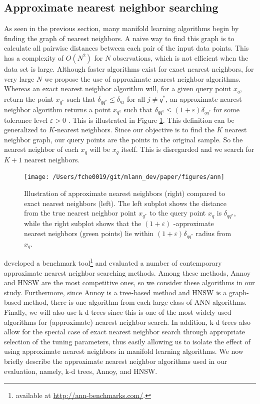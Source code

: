 \documentclass[11pt,a4paper,]{article}
\begin{document}
\hypertarget{ann}{%
\subsection{Approximate nearest neighbor searching}\label{ann}}

As seen in the previous section, many manifold learning algorithms begin by finding the graph of nearest neighbors. A naive way to find this graph is to calculate all pairwise distances between each pair of the input data points. This has a complexity of \(O(N^2)\) for \(N\) observations, which is not efficient when the data set is large. Although faster algorithms exist for exact nearest neighbors, for very large \(N\) we propose the use of approximate nearest neighbor algorithms. Whereas an exact nearest neighbor algorithm will, for a given query point \(x_q\), return the point \(x_{q^*}\) such that \(\delta_{q{q^*}} \leq \delta_{qj}\) for all \(j\neq q^*\), an approximate nearest neighbor algorithm returns a point \(x_{q^\dagger}\) such that \(\delta_{q{q^\dagger}} \leq (1+\varepsilon) \delta_{q{q^*}}\) for some tolerance level \(\varepsilon > 0\) \autocite{Arya1998-bv}. This is illustrated in Figure \ref{fig:ann}. This definition can be generalized to \(K\)-nearest neighbors. Since our objective is to find the \(K\) nearest neighbor graph, our query points are the points in the original sample. So the nearest neighbor of each \(x_q\) will be \(x_q\) itself. This is disregarded and we search for \(K+1\) nearest neighbors.

\begin{figure}

{\centering \texttt{[image: /Users/fche0019/git/mlann\_dev/paper/figures/ann]} 

}

\caption{Illustration of approximate nearest neighbors (right) compared to exact nearest neighbors (left). The left subplot shows the distance from the true nearest neighbor point $x_{q^*}$ to the query point $x_q$ is $\delta_{q{q^*}}$, while the right subplot shows that the $(1+\varepsilon)$ -approximate nearest neighbors (green points) lie within $(1+\varepsilon) \delta_{q{q^*}}$ radius from $x_q$. }\label{fig:ann}
\end{figure}

\textcite{Aumuller2020-nk} developed a benchmark tool\footnote{available at \url{http://ann-benchmarks.com/}.} and evaluated a number of contemporary approximate nearest neighbor searching methods. Among these methods, Annoy and HNSW are the most competitive ones, so we consider these algorithms in our study. Furthermore, since Annoy is a tree-based method and HNSW is a graph-based method, there is one algorithm from each large class of ANN algorithms. Finally, we will also use k-d trees since this is one of the most widely used algorithms for (approximate) nearest neighbor search. In addition, k-d trees also allow for the special case of exact nearest neighbor search through appropriate selection of the tuning parameters, thus easily allowing us to isolate the effect of using approximate nearest neighbors in manifold learning algorithms. We now briefly describe the approximate nearest neighbor algorithms used in our evaluation, namely, k-d trees, Annoy, and HNSW.
\end{document}
